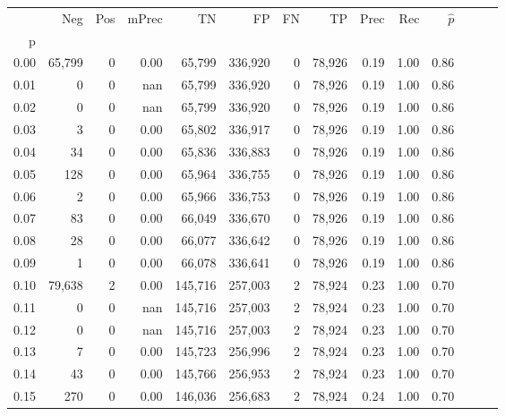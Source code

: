 \begin{tabular}{rrrrrrrrrrrrrr}
\toprule
{} &     Neg &     Pos & mPrec &       TN &       FP &      FN &      TP &  Prec &   Rec & $\hat{p}$ \\
p    &         &         &       &          &          &         &         &       &       &           \\
\midrule
0.00 &  65,799 &       0 &  0.00 &   65,799 &  336,920 &       0 &  78,926 &  0.19 &  1.00 &      0.86 \\
0.01 &       0 &       0 &   nan &   65,799 &  336,920 &       0 &  78,926 &  0.19 &  1.00 &      0.86 \\
0.02 &       0 &       0 &   nan &   65,799 &  336,920 &       0 &  78,926 &  0.19 &  1.00 &      0.86 \\
0.03 &       3 &       0 &  0.00 &   65,802 &  336,917 &       0 &  78,926 &  0.19 &  1.00 &      0.86 \\
0.04 &      34 &       0 &  0.00 &   65,836 &  336,883 &       0 &  78,926 &  0.19 &  1.00 &      0.86 \\
0.05 &     128 &       0 &  0.00 &   65,964 &  336,755 &       0 &  78,926 &  0.19 &  1.00 &      0.86 \\
0.06 &       2 &       0 &  0.00 &   65,966 &  336,753 &       0 &  78,926 &  0.19 &  1.00 &      0.86 \\
0.07 &      83 &       0 &  0.00 &   66,049 &  336,670 &       0 &  78,926 &  0.19 &  1.00 &      0.86 \\
0.08 &      28 &       0 &  0.00 &   66,077 &  336,642 &       0 &  78,926 &  0.19 &  1.00 &      0.86 \\
0.09 &       1 &       0 &  0.00 &   66,078 &  336,641 &       0 &  78,926 &  0.19 &  1.00 &      0.86 \\
0.10 &  79,638 &       2 &  0.00 &  145,716 &  257,003 &       2 &  78,924 &  0.23 &  1.00 &      0.70 \\
0.11 &       0 &       0 &   nan &  145,716 &  257,003 &       2 &  78,924 &  0.23 &  1.00 &      0.70 \\
0.12 &       0 &       0 &   nan &  145,716 &  257,003 &       2 &  78,924 &  0.23 &  1.00 &      0.70 \\
0.13 &       7 &       0 &  0.00 &  145,723 &  256,996 &       2 &  78,924 &  0.23 &  1.00 &      0.70 \\
0.14 &      43 &       0 &  0.00 &  145,766 &  256,953 &       2 &  78,924 &  0.23 &  1.00 &      0.70 \\
0.15 &     270 &       0 &  0.00 &  146,036 &  256,683 &       2 &  78,924 &  0.24 &  1.00 &      0.70 \\

\end{tabular}
